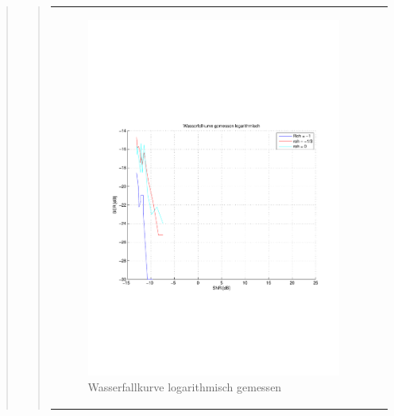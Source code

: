 \begin{quote}
\begin{quote}
\begin{center}
\begin{tabular}{ll}
\begin{minipage}{0.6\textwidth}
                        \begin{figure}[H]
                            \label{fig:}
                            \includegraphics[scale=0.45, trim = 1.5cm 7cm 1cm
                            8.5cm,
                            clip]{./Bilder/aufgabe2/Wasserfallkurve_gemessen_logarithmisch}
                            \caption{Wasserfallkurve logarithmisch gemessen}
                        \end{figure}
                    \vspace{-1.5em}
    
                    \end{minipage}
    
                \end{tabular}
                \end{center}
                

\end{quote}
\end{quote}
